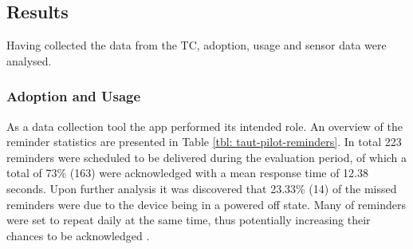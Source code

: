 \subsection{Results}
Having collected the data from the TC, adoption, usage and sensor data were analysed.

\subsubsection{Adoption and Usage}
As a data collection tool the app performed its intended role. An overview of the reminder statistics are presented in Table \ref{tbl: taut-pilot-reminders}. In total 223 reminders were scheduled to be delivered during the evaluation period, of which a total of 73\% (163) were acknowledged with a mean response time of 12.38 seconds. Upon further analysis it was discovered that 23.33\% (14) of the missed reminders were due to the device being in a powered off state. Many of reminders were set to repeat daily at the same time, thus potentially increasing their chances to be acknowledged \cite{Hartin2014-EMBC}.

